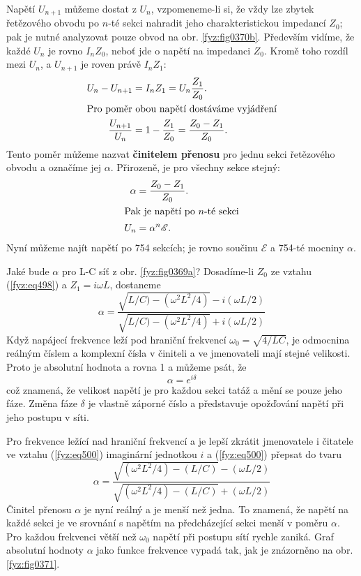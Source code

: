   Napětí \(U_{n+1}\) můžeme dostat z \(U_n\), vzpomeneme-li si, že vždy lze zbytek řetězového 
  obvodu po \(n\)-té sekci nahradit jeho charakteristickou impedancí \(Z_0\); pak je nutné 
  analyzovat pouze obvod na obr. \ref{fyz:fig0370b}. Především vidíme, že každé \(U_n\) je rovno 
  \(I_nZ_0\), neboť jde o napětí na impedanci \(Z_0\). Kromě toho rozdíl mezi \(U_n\), a 
  \(U_{n+1}\) je roven právě \(I_nZ_1\):
  \begin{align*}
    U_n - U_{n+1}       &= I_nZ_1 = U_n\frac{Z_1}{Z_0}.  \\
    \shortintertext{Pro poměr obou napětí dostáváme vyjádření} 
    \frac{U_{n+1}}{U_n} &= 1 - \frac{Z_1}{Z_0} = \frac{Z_0 -Z_1}{Z_0}.
  \end{align*}
  Tento poměr můžeme nazvat \textbf{činitelem přenosu} pro jednu sekci řetězového obvodu a označíme 
  jej \(\alpha\). Přirozeně, je pro všechny sekce stejný: 
  \begin{align*}
    \alpha  &= \frac{Z_0 -Z_1}{Z_0}.  \\
    \shortintertext{Pak je napětí po \(n\)-té sekci} 
    U_n     &= \alpha^n\mathscr{E}.
  \end{align*}
  Nyní můžeme najít napětí po \num{754} sekcích; je rovno součinu \(\mathscr{E}\) a \num{754}-té 
  mocniny \(\alpha\). 
  
  Jaké bude \(\alpha\) pro L-C síť z obr. \ref{fyz:fig0369a}? Dosadíme-li \(Z_0\) ze vztahu 
  (\ref{fyz:eq498}) a \(Z_1 =i\omega L\), dostaneme
  \begin{equation}\label{fyz:eq500}
    \alpha = \dfrac{\sqrt{L/C) - (\omega^2L^2/4)} - i(\omega L/2)}
                   {\sqrt{L/C) - (\omega^2L^2/4)} + i(\omega L/2)}
  \end{equation}
  Když napájecí frekvence leží pod hraniční frekvencí \(\omega_0 =\sqrt{4/LC}\), je odmocnina 
  reálným číslem a komplexní čísla v činiteli a ve jmenovateli mají stejné velikosti. Proto je 
  absolutní hodnota a rovna 1 a můžeme psát, že
  \begin{equation*}
    \alpha = e^{i\delta}
  \end{equation*}
  což znamená, že velikost napětí je pro každou sekci tatáž a mění se pouze jeho fáze. Změna fáze 
  \(\delta\) je vlastně záporné číslo a představuje opožďování napětí při jeho postupu v síti. 
  
  Pro frekvence ležící nad hraniční frekvencí a je lepší zkrátit jmenovatele i čitatele ve vztahu 
  (\ref{fyz:eq500}) imaginární jednotkou \(i\) a (\ref{fyz:eq500}) přepsat do tvaru
  \begin{equation}\label{fyz:eq501}
    \alpha = \dfrac{\sqrt{(\omega^2L^2/4) - (L/C)} - (\omega L/2)}
                   {\sqrt{(\omega^2L^2/4) - (L/C)} + (\omega L/2)}
  \end{equation}
  Činitel přenosu \(\alpha\) je nyní reálný a je menší než jedna. To znamená, že napětí na každé 
  sekci je ve srovnání s napětím na předcházející sekci menší v poměru \(\alpha\). Pro každou 
  frekvenci větší než \(\omega_0\) napětí při postupu sítí rychle zaniká. Graf absolutní hodnoty 
  \(\alpha\) jako funkce frekvence vypadá tak, jak je znázorněno na obr. \ref{fyz:fig0371}. 
  
